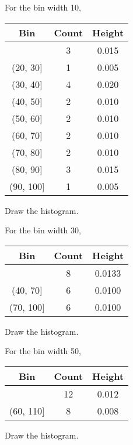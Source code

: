 \documentclass[11pt]{article} %
\begin{document}
For the bin width 10, 
\begin{table}[h!]
\centering
\begin{tabular}{ccc} \\ \hline \hline 
Bin & Count & Height \\ \hline 
[10, 20] & 3 & 0.015 \\
(20, 30] & 1 & 0.005 \\
(30, 40] & 4 & 0.020 \\
(40, 50] & 2 & 0.010 \\
(50, 60] & 2 & 0.010 \\ 
(60, 70] & 2 & 0.010 \\
(70, 80] & 2 & 0.010 \\
(80, 90] & 3 & 0.015 \\
(90, 100] & 1 & 0.005 \\
\hline \hline
\end{tabular}
\end{table}

Draw the histogram. 

For the bin width 30, 
\begin{table}[h!]
\centering
\begin{tabular}{ccc} \\ \hline \hline 
Bin & Count & Height \\ \hline 
[10, 40] & 8 & 0.0133 \\
(40, 70] & 6 & 0.0100 \\
(70, 100] & 6 & 0.0100 \\
\hline \hline
\end{tabular}
\end{table}

Draw the histogram. 

For the bin width 50, 
\begin{table}[h!]
\centering
\begin{tabular}{ccc} \\ \hline \hline 
Bin & Count & Height \\ \hline 
[10, 60] & 12 & 0.012 \\
(60, 110] & 8 & 0.008 \\
\hline \hline
\end{tabular}
\end{table}

Draw the histogram. 
\end{document}
